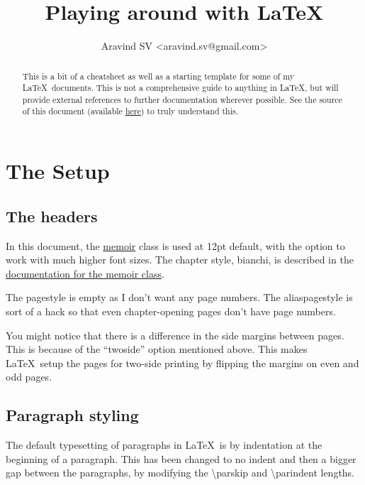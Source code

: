 \documentclass[a4paper,extrafontsizes,12pt,twoside,openany]{memoir}
\newcommand{\showpart}[1]{\noindent}
\begin{document}
\begin{minipage}{\textwidth}
\title{Playing around with \LaTeX} \date{} \author{Aravind SV <aravind.sv@gmail.com>}
\maketitle
\begin{abstract}
This is a bit of a cheatsheet as well as a starting template for some of my \LaTeX\ documents. This is not a comprehensive guide to anything in \LaTeX, but will provide external references to further documentation wherever possible. See the source of this document (available \href{http://github.com/arvindsv/LaTeX.Stuff/blob/master/cheatsheet.tex}{here}) to truly understand this.
\end{abstract}
\thispagestyle{empty}
\end{minipage}

\chapter{The Setup}

\section{The headers}

In this document, the \href{http://tug.ctan.org/cgi-bin/ctanPackageInformation.py?id=memoir}{memoir} class is used at
12pt default, with the option to work with much higher font sizes. The chapter style, bianchi, is described in the
\href{ftp://tug.ctan.org/pub/tex-archive/macros/latex/contrib/memoir/memman.pdf}{documentation for the memoir class}.

The pagestyle is empty as I don't want any page numbers. The aliaspagestyle is sort of a hack so that even
chapter-opening pages don't have page numbers.

You might notice that there is a difference in the side margins between pages. This is because of the ``twoside'' option
mentioned above. This makes \LaTeX\ setup the pages for two-side printing by flipping the margins on even and odd pages.

\showpart{HEADER}

\section{Paragraph styling}

The default typesetting of paragraphs in \LaTeX\ is by indentation at the beginning of a paragraph. This has been changed
to no indent and then a bigger gap between the paragraphs, by modifying the \textbackslash{}parskip and \textbackslash{}parindent lengths.
\end{document}
